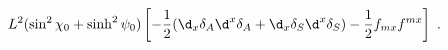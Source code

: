 \begin{equation}
L^2(\sin^2\chi_0+\sinh^2\psi_0)
\left[ -\frac{1}{2}(\d_x\delta_A\d^x\delta_A + \d_x\delta_S\d^x\delta_S)
  -\frac{1}{2}f_{mx}f^{mx} \right]\ .
\end{equation}

